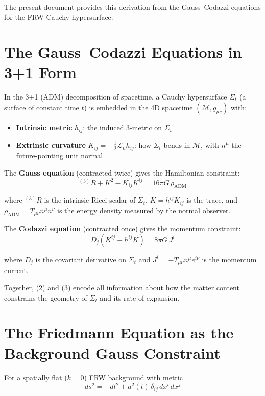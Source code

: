 \documentclass[12pt,a4paper]{article}
\begin{document}
The present document provides this derivation from the Gauss--Codazzi equations for the FRW Cauchy hypersurface.

\section{The Gauss--Codazzi Equations in 3+1 Form}

In the 3+1 (ADM) decomposition of spacetime, a Cauchy hypersurface $\Sigma_t$ (a surface of constant time $t$) is embedded in the 4D spacetime $(\mathcal{M}, g_{\mu\nu})$ with:

\begin{itemize}
  \item \textbf{Intrinsic metric} $h_{ij}$: the induced 3-metric on $\Sigma_t$
  \item \textbf{Extrinsic curvature} $K_{ij} = -\frac{1}{2}\mathcal{L}_n h_{ij}$: how $\Sigma_t$ bends in $\mathcal{M}$, with $n^\mu$ the future-pointing unit normal
\end{itemize}

The \textbf{Gauss equation} (contracted twice) gives the Hamiltonian constraint:
\begin{equation}
{}^{(3)}R + K^2 - K_{ij}K^{ij} = 16\pi G\,\rho_\text{ADM} \tag{2}
\end{equation}

where ${}^{(3)}R$ is the intrinsic Ricci scalar of $\Sigma_t$, $K = h^{ij}K_{ij}$ is the trace, and $\rho_\text{ADM} = T_{\mu\nu}n^\mu n^\nu$ is the energy density measured by the normal observer.

The \textbf{Codazzi equation} (contracted once) gives the momentum constraint:
\begin{equation}
D_j\!\left(K^{ij} - h^{ij}K\right) = 8\pi G\,J^i \tag{3}
\end{equation}

where $D_j$ is the covariant derivative on $\Sigma_t$ and $J^i = -T_{\mu\nu}n^\mu e^{i\nu}$ is the momentum current.

Together, (2) and (3) encode all information about how the matter content constrains the geometry of $\Sigma_t$ and its rate of expansion.

\section{The Friedmann Equation as the Background Gauss Constraint}

For a spatially flat ($k=0$) FRW background with metric
\begin{equation}
ds^2 = -dt^2 + a^2(t)\,\delta_{ij}\,dx^i\,dx^j \tag{4}
\end{equation}
\end{document}
